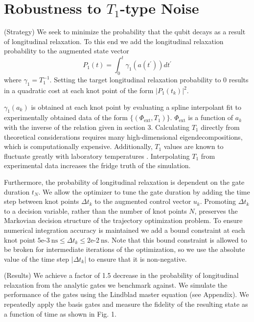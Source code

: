 \documentclass[
  amsfonts,
  amsmath,
  tbtags,
  amssymb,
  aps,
  nobibnotes,
  twocolumn,
]{revtex4-2}
\begin{document}
\section{Robustness to $T_{1}$-type Noise}
(Strategy) We seek to minimize the probability
that the qubit decays as a result of longitudinal
relaxation. To this end we add the
longitudinal relaxation probability
to the augmented state vector
\begin{equation}
  P_{1}(t) = \int_{0}^{t} \gamma_{1}(a(t^{\prime})) dt^{\prime}
\end{equation}
where $\gamma_{1} = T_{1}^{-1}$. Setting the target
longitudinal relaxation probability to 0 results in
a quadratic cost at each knot point
of the form ${\lvert P_{1}(t_{k}) \rvert}^{2}$.

$\gamma_{1}(a_{k})$
is obtained at each knot point by evaluating
a spline interpolant fit to
experimentally obtained data of the form
$\{(\Phi_{\textrm{ext}}, T_{1})\}$.
$\Phi_{\textrm{ext}}$ is a function of $a_{k}$
with the inverse of the relation given in section 3.
Calculating $T_{1}$ directly from theoretical
considerations requires many high-dimensional
eigendecompositions, which
is computationally expensive. Additionally,
$T_{1}$ values are known to fluctuate greatly
with laboratory temperatures \cite{klimov2018fluctuations}.
Interpolating $T_{1}$ from experimental data increases
the fridge truth of the simulation.

Furthermore, the probability of longitudinal 
relaxation is dependent on the gate duration $t_{N}$.
We allow the optimizer to tune the gate duration by
adding the time step between knot points $\Delta t_{k}$
to the augmented control vector $u_{k}$.
Promoting $\Delta t_{k}$ to a decision variable, rather
than the number of knot points $N$, preserves the
Markovian decision structure of the trajectory
optimization problem. To ensure numerical
integration accuracy is maintained we add a bound
constraint at each knot point
$5\textrm{e-}3 \ \textrm{ns} \le
\Delta t_{k} \le 2\textrm{e-}2 \ \textrm{ns}$.
Note that this bound constraint is allowed to be
broken for intermediate iterations of the optimization,
so we use the absolute value of the time step
$\lvert \Delta t_{k} \rvert$ to ensure that it is non-negative.

(Results) We achieve a factor of 1.5 decrease in the probability
of longitudinal relaxation from the analytic gates we benchmark
against. We simulate the performance of the gates using the
Lindblad master equation (see Appendix). We repeatedly apply the basis gates
and measure the fidelity of the resulting state as a function
of time as shown in Fig. 1.
\end{document}

